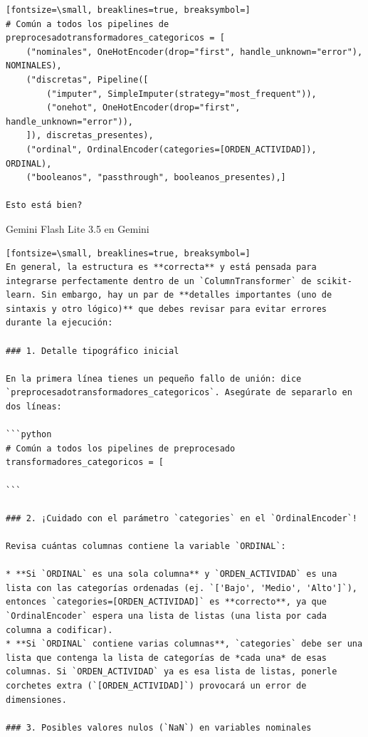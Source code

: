 \documentclass[12pt,a4paper,oneside]{book}
\begin{document}
\begin{iaprompt}
\begin{Verbatim}[fontsize=\small, breaklines=true, breaksymbol=]
# Común a todos los pipelines de preprocesadotransformadores_categoricos = [
    ("nominales", OneHotEncoder(drop="first", handle_unknown="error"), NOMINALES),
    ("discretas", Pipeline([
        ("imputer", SimpleImputer(strategy="most_frequent")),
        ("onehot", OneHotEncoder(drop="first", handle_unknown="error")),
    ]), discretas_presentes),
    ("ordinal", OrdinalEncoder(categories=[ORDEN_ACTIVIDAD]), ORDINAL),
    ("booleanos", "passthrough", booleanos_presentes),]

Esto está bien?
\end{Verbatim}
\end{iaprompt}
\begin{iaresp}{Gemini Flash Lite 3.5 en Gemini}
\begin{Verbatim}[fontsize=\small, breaklines=true, breaksymbol=]
En general, la estructura es **correcta** y está pensada para integrarse perfectamente dentro de un `ColumnTransformer` de scikit-learn. Sin embargo, hay un par de **detalles importantes (uno de sintaxis y otro lógico)** que debes revisar para evitar errores durante la ejecución:

### 1. Detalle tipográfico inicial

En la primera línea tienes un pequeño fallo de unión: dice `preprocesadotransformadores_categoricos`. Asegúrate de separarlo en dos líneas:

```python
# Común a todos los pipelines de preprocesado
transformadores_categoricos = [

```

### 2. ¡Cuidado con el parámetro `categories` en el `OrdinalEncoder`!

Revisa cuántas columnas contiene la variable `ORDINAL`:

* **Si `ORDINAL` es una sola columna** y `ORDEN_ACTIVIDAD` es una lista con las categorías ordenadas (ej. `['Bajo', 'Medio', 'Alto']`), entonces `categories=[ORDEN_ACTIVIDAD]` es **correcto**, ya que `OrdinalEncoder` espera una lista de listas (una lista por cada columna a codificar).
* **Si `ORDINAL` contiene varias columnas**, `categories` debe ser una lista que contenga la lista de categorías de *cada una* de esas columnas. Si `ORDEN_ACTIVIDAD` ya es esa lista de listas, ponerle corchetes extra (`[ORDEN_ACTIVIDAD]`) provocará un error de dimensiones.

### 3. Posibles valores nulos (`NaN`) en variables nominales


\end{Verbatim}
\end{iaresp}
\end{document}
